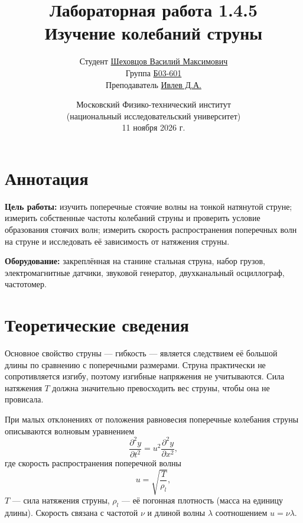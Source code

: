 \documentclass[12pt,a4paper]{article}
\title{\textbf{Лабораторная работа 1.4.5}\\
Изучение колебаний струны}
\author{
    Студент \underline{Шеховцов Василий Максимович}\\
    Группа \underline{Б03-601}\\
    Преподаватель \underline{Ивлев Д.А.}
}
\date{
Московский Физико-технический институт\\
(национальный исследовательский университет)\\
11 ноября 2026 г.
}
\begin{document}

\maketitle

\section{Аннотация}

\textbf{Цель работы:} изучить поперечные стоячие волны на тонкой натянутой струне; измерить собственные частоты колебаний струны и проверить условие образования стоячих волн; измерить скорость распространения поперечных волн на струне и исследовать её зависимость от натяжения струны.

\textbf{Оборудование:} закреплённая на станине стальная струна, набор грузов, электромагнитные датчики, звуковой генератор, двухканальный осциллограф, частотомер.

\section{Теоретические сведения}

Основное свойство струны --- гибкость --- является следствием её большой длины по сравнению с поперечными размерами. Струна практически не сопротивляется изгибу, поэтому изгибные напряжения не учитываются. Сила натяжения $T$ должна значительно превосходить вес струны, чтобы она не провисала.

При малых отклонениях от положения равновесия поперечные колебания струны описываются волновым уравнением
\begin{equation}
    \frac{\partial^2 y}{\partial t^2} = u^2\frac{\partial^2 y}{\partial x^2},
    \label{eq:wave}
\end{equation}
где скорость распространения поперечной волны
\begin{equation}
    u = \sqrt{\frac{T}{\rho_l}},
    \label{eq:u}
\end{equation}
$T$ --- сила натяжения струны, $\rho_l$ --- её погонная плотность (масса на единицу длины). Скорость связана с частотой $\nu$ и длиной волны $\lambda$ соотношением $u = \nu\lambda$.
\end{document}
